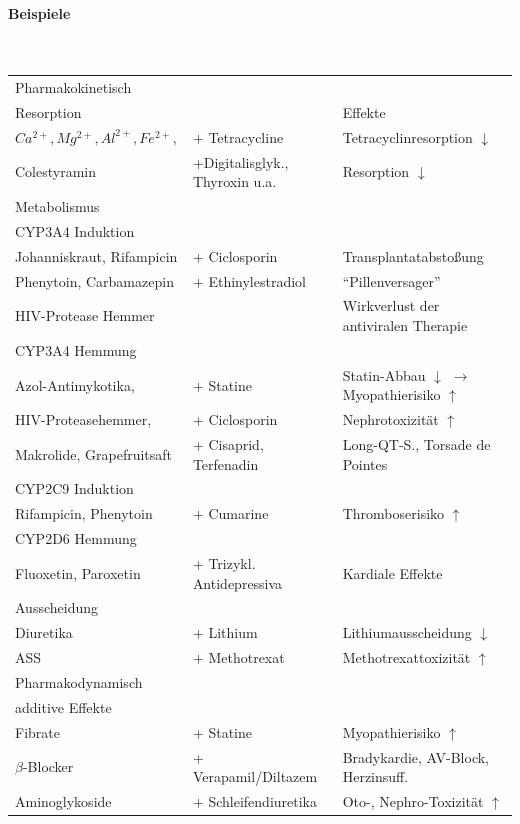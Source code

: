 \documentclass[10pt,a4paper]{report}
\begin{document}
\paragraph{Beispiele}\mbox{} \\
\begin{tabularx}{\textwidth}{XXX}
Pharmakokinetisch&&\\
Resorption&&Effekte\\                                                                       
$Ca^{2+}, Mg^{2+}, Al^{2+}, Fe^{2+},$ &+ Tetracycline & Tetracyclinresorption $\downarrow$\\
Colestyramin&+Digitalisglyk., Thyroxin u.a.&Resorption $\downarrow$\\
Metabolismus&&\\
CYP3A4 Induktion&&\\
Johanniskraut, Rifampicin&+ Ciclosporin&Transplantatabstoßung\\
Phenytoin, Carbamazepin&+ Ethinylestradiol&“Pillenversager”\\
HIV-Protease Hemmer&&Wirkverlust der antiviralen Therapie\\
CYP3A4 Hemmung&&\\
Azol-Antimykotika,&+ Statine&Statin-Abbau $\downarrow$ $\rightarrow$ Myopathierisiko $\uparrow$\\
HIV-Proteasehemmer,& + Ciclosporin& Nephrotoxizität $\uparrow$\\
Makrolide, Grapefruitsaft& + Cisaprid, Terfenadin& Long-QT-S., Torsade de Pointes\\
CYP2C9 Induktion&&\\
Rifampicin, Phenytoin&+ Cumarine&Thromboserisiko $\uparrow$\\
CYP2D6 Hemmung&&\\
Fluoxetin, Paroxetin&+ Trizykl. Antidepressiva&Kardiale Effekte\\
Ausscheidung&&\\
Diuretika&+ Lithium&Lithiumausscheidung $\downarrow$\\
ASS&+ Methotrexat&Methotrexattoxizität $\uparrow$\\
Pharmakodynamisch&&\\
additive Effekte&&\\
Fibrate&+ Statine&Myopathierisiko $\uparrow$\\
$\beta$-Blocker&+ Verapamil/Diltazem&Bradykardie, AV-Block, Herzinsuff.\\
Aminoglykoside&+ Schleifendiuretika&Oto-, Nephro-Toxizität $\uparrow$\\

\end{tabularx}
\end{document}
